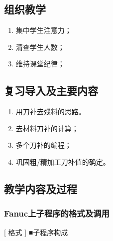 \jxhj{%
	}

\makeshouye %

\subsection{组织教学}
\begin{enumerate}[\hspace{2em}1、]
	\item 集中学生注意力；
	\item 清查学生人数；
	\item 维持课堂纪律；
\end{enumerate}
\subsection{复习导入及主要内容}
\begin{enumerate}[1、]
	\item 用刀补去残料的思路。
\item 去材料刀补的计算；
\item 多个刀补的编程；
\item 巩固粗/精加工刀补值的确定。
\end{enumerate}

\subsection{教学内容及过程}

\subsubsection{Fanuc上子程序的格式及调用}
[ 格式 ]
■子程序构成

